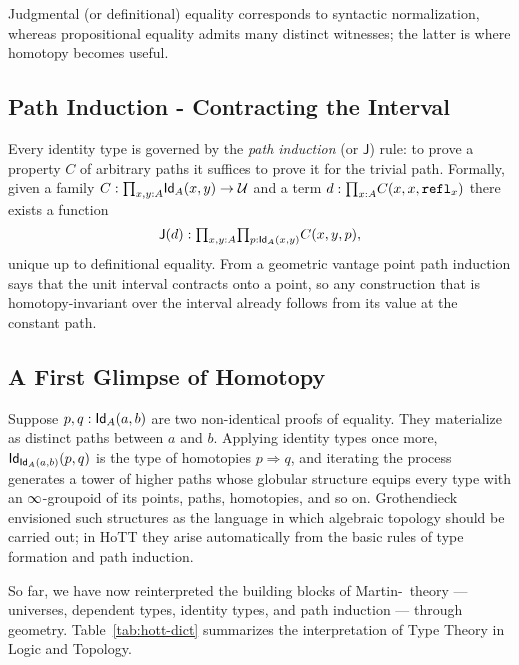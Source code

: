 Judgmental (or definitional) equality corresponds to syntactic normalization, 
whereas propositional equality admits many distinct witnesses; 
the latter is where homotopy becomes useful.

\subsection{Path Induction - Contracting the Interval}
Every identity type is governed by the \emph{path induction} (or
\(\mathsf{J}\)) rule: to prove a property \(C\) of arbitrary paths it
suffices to prove it for the trivial path.  Formally, given a family
\(C:\textstyle\mathbf{\prod}_{x,y:A}\textsf{Id}_{A}(x,y)\to\mathcal{U}\) and a term
\(d:\textstyle\mathbf{\prod}_{x:A}C(x,x,\texttt{refl}_{x})\) there exists a function
\[
    \mathsf{J}(d):\textstyle\mathbf{\prod}_{x,y:A}\textstyle\mathbf{\prod}_{p:\textsf{Id}_{A}(x,y)}C(x,y,p),
\]
unique up to definitional equality.  From a geometric vantage point
path induction says that the unit interval contracts onto a point, so
any construction that is homotopy-invariant over the interval already
follows from its value at the constant path.

\subsection{A First Glimpse of Homotopy}\label{subsec:first-homotopy}
Suppose \(p,q:\textsf{Id}_{A}(a,b)\) are two non-identical proofs of equality.
They materialize as distinct paths between \(a\) and \(b\).
Applying identity types once more,
\(\textsf{Id}_{\textsf{Id}_{A}(a,b)}(p,q)\) is the type of homotopies \(p\Rightarrow q\),
and iterating the process generates a tower of higher paths whose
globular structure equips every type with an \(\infty\)-groupoid of its
points, paths, homotopies, and so on.  Grothendieck envisioned such
structures as the language in which algebraic topology should be
carried out; in HoTT they arise automatically from the basic rules of
type formation and path induction.

So far, we have now reinterpreted the building blocks of Martin-\Lof\ theory — universes, dependent types, identity types, and path induction --- through geometry.  
Table~\ref{tab:hott-dict} summarizes the interpretation of Type Theory in Logic and Topology.